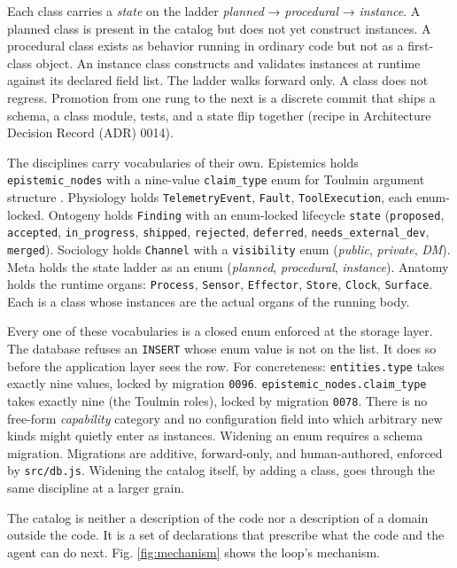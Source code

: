 \documentclass[conference,10pt]{IEEEtran}
\begin{document}
Each class carries a \emph{state} on the ladder \emph{planned} → \emph{procedural} →
\emph{instance}. A planned class is present in the catalog but does not yet
construct instances. A procedural class exists as behavior running in
ordinary code but not as a first-class object. An instance class
constructs and validates instances at runtime against its declared field
list. The ladder walks forward only. A class does not regress. Promotion
from one rung to the next is a discrete commit that ships a schema, a
class module, tests, and a state flip together (recipe in
Architecture Decision Record (ADR) 0014).

The disciplines carry vocabularies of their own. Epistemics holds
\texttt{epistemic\_nodes} with a nine-value \texttt{claim\_type} enum for Toulmin
argument structure \cite{toulmin1958}. Physiology holds \texttt{TelemetryEvent},
\texttt{Fault}, \texttt{ToolExecution}, each enum-locked. Ontogeny holds \texttt{Finding} with an enum-locked lifecycle \texttt{state} (\texttt{proposed}, \texttt{accepted}, \texttt{in\_progress}, \texttt{shipped}, \texttt{rejected}, \texttt{deferred}, \texttt{needs\_external\_dev}, \texttt{merged}). Sociology holds \texttt{Channel} with a
\texttt{visibility} enum (\emph{public}, \emph{private}, \emph{DM}). Meta holds the state
ladder as an enum (\emph{planned}, \emph{procedural}, \emph{instance}). Anatomy holds
the runtime organs: \texttt{Process}, \texttt{Sensor}, \texttt{Effector}, \texttt{Store}, \texttt{Clock},
\texttt{Surface}. Each is a class whose instances are the actual organs of
the running body.

Every one of these vocabularies is a closed enum enforced at the storage
layer. The database refuses an \texttt{INSERT} whose enum value is not on the
list. It does so before the application layer sees the row. For
concreteness: \texttt{entities.type} takes exactly nine values, locked by
migration \texttt{0096}. \texttt{epistemic\_nodes.claim\_type} takes exactly nine (the
Toulmin roles), locked by migration \texttt{0078}. There is no free-form
\emph{capability} category and no configuration field into which arbitrary
new kinds might quietly enter as instances. Widening an enum requires a
schema migration. Migrations are additive, forward-only, and
human-authored, enforced by \texttt{src/db.js}. Widening the catalog itself, by
adding a class, goes through the same discipline at a larger grain.

The catalog is neither a description of the code nor a description of a
domain outside the code. It is a set of declarations that prescribe what
the code and the agent can do next.
Fig. \ref{fig:mechanism} shows the loop's mechanism.
\end{document}
